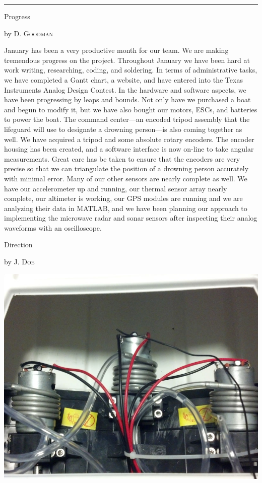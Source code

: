 \documentclass[10pt,a4paper]{article}
\newcommand{\SepRule}{\noindent							 %
						\begin{center}
							\rule{250pt}{1pt}
						\end{center}
						}
\newcommand{\NewsItem}[1]{%
		\usefont{T1}{augie}{m}{n} 	
		\large #1 \vspace{4pt}
		\par \normalsize \normalfont}
\newcommand{\NewsAuthor}[1]{%
			\hfill by \textsc{#1} \vspace{4pt}
			\par \normalfont}
\begin{document}
\vspace{0.5cm}
	\SepRule
\vspace{0.5cm}
\begin{multicols}{3}
	\NewsItem{Progress}
	\NewsAuthor{D. Goodman}
	January has been a very productive month for our team. We are making tremendous progress on the project. Throughout January we have been hard at work writing, researching, coding, and soldering. In terms of administrative tasks, we have completed a Gantt chart, a website, and have entered into the Texas Instruments Analog Design Contest. In the hardware and software aspects, we have been progressing by leaps and bounds. Not only have we purchased a boat and begun to modify it, but we have also bought our motors, ESCs, and batteries to power the boat.  The command center---an encoded tripod assembly that the lifeguard will use to designate a drowning person---is also coming together as well. We have acquired a tripod and some absolute rotary encoders. The encoder housing has been created, and a software interface is now on-line to take angular measurements. Great care has be taken to ensure that the encoders are very precise so that we can triangulate the position of a drowning person accurately with minimal error. Many of our other sensors are nearly complete as well. We have our accelerometer up and running, our thermal sensor array nearly complete, our altimeter is working, our GPS modules are running and we are analyzing their data in MATLAB, and we have been planning our approach to implementing the microwave radar and sonar sensors after inspecting their analog waveforms with an oscilloscope. 

\vspace{1cm}
\NewsItem{Direction}
\NewsAuthor{J. Doe}
	\blindtext[1]
		\begin{center}
			\includegraphics[width=0.78\linewidth]{old_motors.jpg}
		\end{center}
		\blindtext[1]
\end{multicols}
\end{document}
